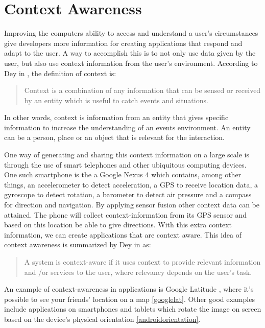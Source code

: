 \section{Context Awareness}
Improving the computers ability to access and understand a user's circumstances give developers more information for creating  applications that respond and adapt to the user. A way to accomplish this is to not only use data given by the user, but also use context information from the user's environment. According to Dey in \cite{dey2001understanding}, the definition of context is:

\begin{quotation}
\centering
Context is a combination of any information that can be sensed or received by an entity which is useful to catch events and situations.
\end{quotation}

In other words, context is information from an entity that gives specific information to increase the understanding of an events environment. An entity can be a person, place or an object that is relevant for the interaction. 

One way of generating and sharing this context information on a large scale is through the use of smart telephones and other ubiquitous computing devices. One such smartphone is the a Google Nexus 4 \cite{GoogleNexus} which contains, among other things, an accelerometer to detect acceleration, a GPS to receive location data, a gyroscope to detect rotation, a barometer to detect air pressure and a compass for direction and navigation. By applying sensor fusion \cite{Elmenreich02sensorfusion} other context data can be attained. The phone will collect context-information from its GPS sensor and based on this location be able to give directions. With this extra context information, we can create applications that are context aware. This idea of context awareness is summarized by Dey in \cite{dey2001understanding} as: 

\begin{quotation}
\centering
A system is context-aware if it uses context to provide relevant information and \slash or services to the user, where relevancy depends on the user's task.
\end{quotation}

An example of context-awareness in applications is Google Latitude \cite{GoogleLatitude}, where it's possible to see your friends' location on a map \ref{googlelat}. Other good examples include applications on smartphones and tablets which rotate the image on screen based on the device's physical orientation \ref{androidorientation}.

